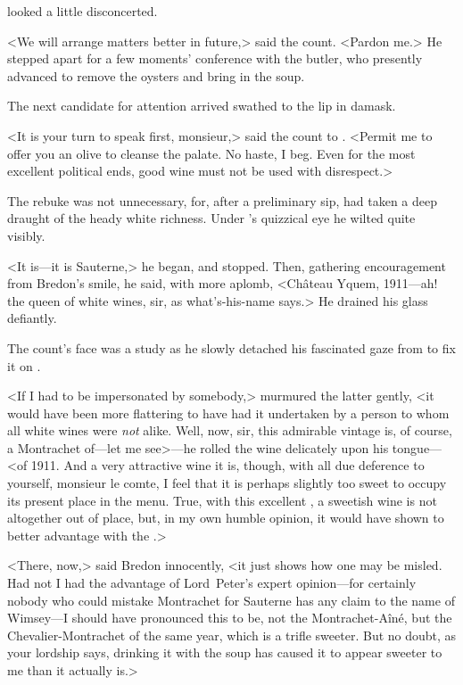  looked a little disconcerted.

<We will arrange matters better in future,> said the count. <Pardon me.> He stepped apart for a few moments' conference with the butler, who presently advanced to remove the oysters and bring in the soup.

The next candidate for attention arrived swathed to the lip in damask.

<It is your turn to speak first, monsieur,> said the count to . <Permit me to offer you an olive to cleanse the palate. No haste, I beg. Even for the most excellent political ends, good wine must not be used with disrespect.>

The rebuke was not unnecessary, for, after a preliminary sip,  had taken a deep draught of the heady white richness. Under 's quizzical eye he wilted quite visibly.

<It is—it is Sauterne,> he began, and stopped. Then, gathering encouragement from Bredon's smile, he said, with more aplomb, <Château Yquem, 1911—ah! the queen of white wines, sir, as what's-his-name says.> He drained his glass defiantly.

The count's face was a study as he slowly detached his fascinated gaze from  to fix it on .

<If I had to be impersonated by somebody,> murmured the latter gently, <it would have been more flattering to have had it undertaken by a person to whom all white wines were \emph{not} alike. Well, now, sir, this admirable vintage is, of course, a Montrachet of—let me see>—he rolled the wine delicately upon his tongue—<of 1911. And a very attractive wine it is, though, with all due deference to yourself, monsieur le comte, I feel that it is perhaps slightly too sweet to occupy its present place in the menu. True, with this excellent , a sweetish wine is not altogether out of place, but, in my own humble opinion, it would have shown to better advantage with the .>

<There, now,> said Bredon innocently, <it just shows how one may be misled. Had not I had the advantage of Lord~Peter's expert opinion—for certainly nobody who could mistake Montrachet for Sauterne has any claim to the name of Wimsey—I should have pronounced this to be, not the Montrachet-Aîné, but the Chevalier-Montrachet of the same year, which is a trifle sweeter. But no doubt, as your lordship says, drinking it with the soup has caused it to appear sweeter to me than it actually is.>

